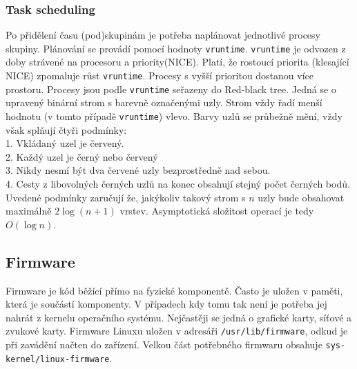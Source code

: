 \documentclass[12pt,a4paper,twoside,]{article}
\begin{document}
{\subsubsection{\textsf{Task scheduling}}
Po přidělení času (pod)skupinám je potřeba naplánovat jednotlivé procesy skupiny. Plánování se provádí pomocí hodnoty \texttt{vruntime}. \texttt{vruntime} je odvozen z doby strávené na procesoru a priority(NICE). Platí, že rostoucí priorita (klesající NICE) zpomaluje růst \texttt{vruntime}. Procesy s vyšší prioritou dostanou více prostoru. Procesy jsou podle \texttt{vruntime} seřazeny do Red-black tree. Jedná se o upravený binární strom s barevně označenými uzly. Strom vždy řadí menší hodnotu (v tomto případě \texttt{vruntime}) vlevo. Barvy uzlů se průbežně mění, vždy však splňují čtyři podmínky:\\
1. Vkládaný uzel je červený.\\2. Každý uzel je černý nebo červený\\3. Nikdy nesmí být dva červené uzly bezprostředně nad sebou.\\4. Cesty z libovolných černých uzlů na konec obsahují stejný počet černých bodů. \\ 

Uvedené podmínky zaručují že, jakýkoliv takový strom s $n$ uzly bude obsahovat maximálně $2\log(n+1)$ vrstev. Asymptotická složitost operací je tedy $O(\log n)$.\\


\subsection{\textsf{Firmware}}

Firmware je kód běžící přímo na fyzické komponentě. Často je uložen v paměti, která je součástí komponenty. V případech kdy tomu tak není je potřeba jej nahrát z kernelu operačního systému. Nejčastěji se jedná o grafické karty, síťové a zvukové karty. 
Firmware Linuxu uložen v adresáři \texttt{/usr/lib/firmware}, odkud je při zavádění načten do zařízení. Velkou část potřebného firmwaru obsahuje \texttt{sys-kernel/linux-firmware}. 

}
\end{document}
